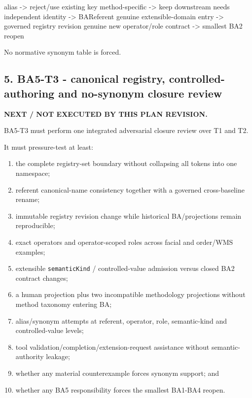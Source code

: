 \documentclass[
  10pt,
  a4paper,
]{article}
\newenvironment{Shaded}{}{}
\newcommand{\NormalTok}[1]{#1}
\providecommand{\tightlist}{%
  \setlength{\itemsep}{0pt}\setlength{\parskip}{0pt}}
\begin{document}
\begin{Shaded}
\begin{Highlighting}[]
\NormalTok{alias {-}\textgreater{} reject/use existing key}
\NormalTok{method{-}specific {-}\textgreater{} keep downstream}
\NormalTok{needs independent identity {-}\textgreater{} BAReferent}
\NormalTok{genuine extensible{-}domain entry {-}\textgreater{} governed registry revision}
\NormalTok{genuine new operator/role contract {-}\textgreater{} smallest BA2 reopen}
\end{Highlighting}
\end{Shaded}

No normative synonym table is forced.

\subsection{5. BA5-T3 - canonical registry, controlled-authoring and
no-synonym closure
review}\label{ba5-t3---canonical-registry-controlled-authoring-and-no-synonym-closure-review}

\textbf{NEXT / NOT EXECUTED BY THIS PLAN REVISION.}

BA5-T3 must perform one integrated adversarial closure review over T1
and T2.

It must pressure-test at least:

\begin{enumerate}
\def\labelenumi{\arabic{enumi}.}
\tightlist
\item
  the complete registry-set boundary without collapsing all tokens into
  one namespace;
\item
  referent canonical-name consistency together with a governed
  cross-baseline rename;
\item
  immutable registry revision change while historical BA/projections
  remain reproducible;
\item
  exact operators and operator-scoped roles across facial and order/WMS
  examples;
\item
  extensible \texttt{semanticKind} / controlled-value admission versus
  closed BA2 contract changes;
\item
  a human projection plus two incompatible methodology projections
  without method taxonomy entering BA;
\item
  alias/synonym attempts at referent, operator, role, semantic-kind and
  controlled-value levels;
\item
  tool validation/completion/extension-request assistance without
  semantic-authority leakage;
\item
  whether any material counterexample forces synonym support; and
\item
  whether any BA5 responsibility forces the smallest BA1-BA4 reopen.
\end{enumerate}
\end{document}
